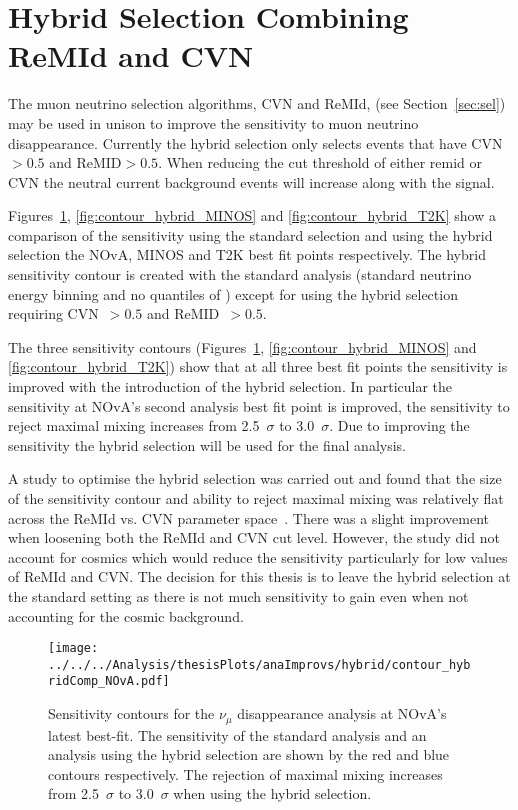 \section{Hybrid Selection Combining ReMId and
  CVN}\label{sec:hybridSelection} 

The muon neutrino selection algorithms, CVN and ReMId, (see
Section~\ref{sec:sel}) may be used in unison to improve the
sensitivity to muon neutrino disappearance. 
Currently the hybrid selection only selects events that have CVN$>
0.5$ and ReMID$> 0.5$.
When reducing the cut threshold of either remid or CVN the neutral
current background events will increase along with the signal. 

Figures~\ref{fig:contour_hybrid_NOvA}, \ref{fig:contour_hybrid_MINOS}
and \ref{fig:contour_hybrid_T2K} show a comparison of the sensitivity
using the standard selection and using the hybrid selection the NOvA,
MINOS and T2K best fit points respectively. The hybrid sensitivity
contour is created with the standard analysis (standard neutrino
energy binning and no quantiles of \hadefrac{}) except for using the
hybrid selection requiring CVN~$>0.5$ and ReMID~$>0.5$. 

The three sensitivity contours (Figures~\ref{fig:contour_hybrid_NOvA},
\ref{fig:contour_hybrid_MINOS} and \ref{fig:contour_hybrid_T2K}) show
that at all three best fit points the sensitivity is improved with the
introduction of the hybrid selection.
In particular the sensitivity at NOvA's second analysis best fit point
is improved, the sensitivity to reject maximal mixing increases from
2.5~$\sigma$ to 3.0~$\sigma$. Due to improving the sensitivity the
hybrid selection will be used for the final analysis. 

A study to optimise the hybrid selection was carried
out and found that the size of the sensitivity
contour and ability to reject maximal mixing was relatively flat
across the ReMId vs. CVN parameter space~\cite{LukeHybridOpt}. 
There was a slight improvement when loosening both the ReMId and CVN
cut level.  
However, the study did not account for cosmics which would reduce the
sensitivity particularly for low values of ReMId and CVN. The decision
for this thesis is to leave the hybrid selection at the standard
setting as there is not much sensitivity to gain even when not
accounting for the cosmic background.

\begin{figure}
  \centering
\texttt{[image: ../../../Analysis/thesisPlots/anaImprovs/hybrid/contour\_hybridComp\_NOvA.pdf]}
  \caption{
    Sensitivity contours for the $\nu_\mu$ disappearance analysis at
    NOvA's latest best-fit. The sensitivity of the standard analysis
    and an analysis using the hybrid selection are shown by the red
    and blue contours respectively. The rejection of maximal mixing
    increases from 2.5~$\sigma$ to 3.0~$\sigma$ when using the hybrid
    selection. 
  } 
  \label{fig:contour_hybrid_NOvA}
\end{figure}

